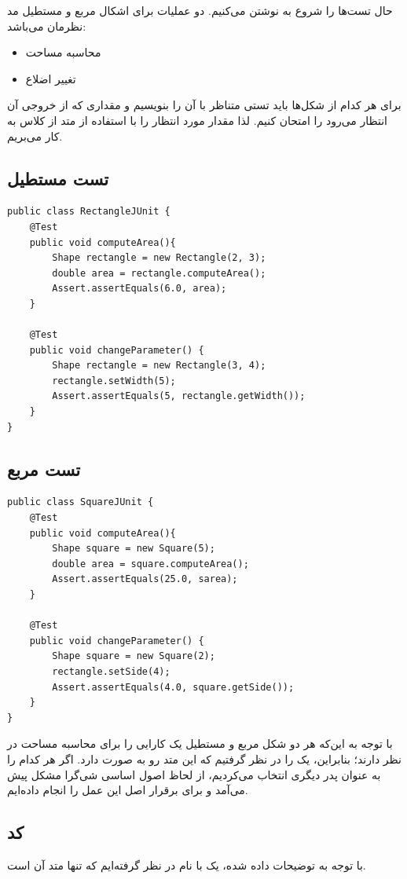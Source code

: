 حال تست‌ها را شروع به نوشتن می‌کنیم. دو عملیات برای اشکال مربع و مستطیل مد نظرمان می‌باشد: 
\begin{itemize}
	\item محاسبه مساحت
	\item تغییر اضلاع
\end{itemize}

برای هر کدام از شکل‌ها باید تستی متناظر با آن را بنویسیم و مقداری که از خروجی آن انتظار می‌رود را امتحان کنیم. لذا مقدار مورد انتظار را با استفاده از متد  از کلاس  به کار می‌بریم. 

\subsection*{تست مستطیل}
\begin{Verbatim}[tabsize=4]
public class RectangleJUnit {
	@Test
	public void computeArea(){
		Shape rectangle = new Rectangle(2, 3);
		double area = rectangle.computeArea();
		Assert.assertEquals(6.0, area);
	}
	
	@Test
	public void changeParameter() {
		Shape rectangle = new Rectangle(3, 4);
		rectangle.setWidth(5);
		Assert.assertEquals(5, rectangle.getWidth());
	}
}
\end{Verbatim}

\subsection*{تست مربع}
\begin{Verbatim}
public class SquareJUnit {
	@Test
	public void computeArea(){
		Shape square = new Square(5);
		double area = square.computeArea();
		Assert.assertEquals(25.0, sarea);
	}

	@Test
	public void changeParameter() {
		Shape square = new Square(2);
		rectangle.setSide(4);
		Assert.assertEquals(4.0, square.getSide());
	}
}
\end{Verbatim}

\newpage
{}

با توجه به این‌که هر دو شکل مربع و مستطیل یک کارایی را برای محاسبه مساحت در نظر دارند؛ بنابراین، یک  را در نظر گرفتیم که این متد رو به صورت  دارد. اگر هر کدام را به عنوان پدر دیگری انتخاب می‌کردیم، از لحاظ اصول‌ اساسی شی‌گرا مشکل پیش می‌آمد و برای برقرار اصل  این عمل را انجام داده‌ایم.

\subsection*{کد }
با توجه به توضیحات داده شده، یک  با نام  در نظر گرفته‌ایم که تنها متد آن  است.

